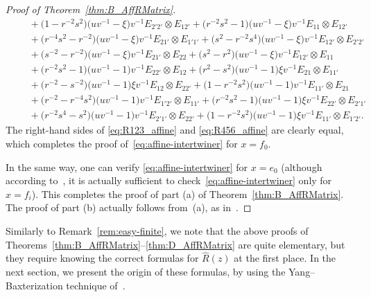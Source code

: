 \documentclass[10pt,a4paper]{amsart}
\numberwithin{equation}{section}
\begin{document}
\begin{proof}[Proof of Theorem~\ref{thm:B_AffRMatrix}]
\begin{gather}
 \qquad{} + \bigl(1 - r^{-2}s^{2}\bigr)\bigl(uv^{-1} - \xi\bigr)v^{-1}E_{2'2'} \otimes E_{12'} + \bigl(r^{-2}s^{2} - 1\bigr)\bigl(uv^{-1} - \xi\bigr)v^{-1}E_{11} \otimes E_{12'} \nonumber\\
 \qquad{} + \bigl(r^{-4}s^{2} - r^{-2}\bigr)\bigl(uv^{-1} -\xi\bigr)v^{-1}E_{21'} \otimes E_{1'1'} + \bigl(s^{2} - r^{-2}s^{4}\bigr)\bigl(uv^{-1} - \xi\bigr)v^{-1}E_{12'} \otimes E_{2'2'} \nonumber\\
 \qquad{} + \bigl(s^{-2} - r^{-2}\bigr)\bigl(uv^{-1} - \xi\bigr)v^{-1}E_{21'} \otimes E_{22} + \bigl(s^{2} - r^{2}\bigr)\bigl(uv^{-1} - \xi\bigr)v^{-1}E_{12'} \otimes E_{11} \nonumber\\
 \qquad{} +\bigl(r^{-2}s^{2} - 1\bigr)\bigl(uv^{-1} - 1\bigr)v^{-1}E_{22'} \otimes E_{12} +\bigl(r^{2} - s^{2}\bigr)\bigl(uv^{-1} - 1\bigr)\xi v^{-1}E_{21} \otimes E_{11'} \nonumber\\
 \qquad{} + \bigl(r^{-2} - s^{-2}\bigr)\bigl(uv^{-1} - 1\bigr)\xi v^{-1}E_{12} \otimes E_{22'} + \bigl(1 - r^{-2}s^{2}\bigr)\bigl(uv^{-1} - 1\bigr)v^{-1}E_{11'} \otimes E_{21} \nonumber\\
 \qquad{} +\bigl(r^{-2} - r^{-4}s^{2}\bigr)\bigl(uv^{-1} - 1\bigr)v^{-1}E_{1'2'} \otimes E_{11'} + \bigl(r^{-2}s^{2} - 1\bigr)\bigl(uv^{-1} - 1\bigr)\xi v^{-1}E_{22'} \otimes E_{2'1'} \nonumber\\
 \qquad{} + \bigl(r^{-2}s^{4} - s^{2}\bigr)\bigl(uv^{-1} - 1\bigr)v^{-1}E_{2'1'} \otimes E_{22'} + \bigl(1 - r^{-2}s^{2}\bigr)\bigl(uv^{-1} - 1\bigr)\xi v^{-1}E_{11'} \otimes E_{1'2'}.\nonumber
\end{gather}
The right-hand sides of \eqref{eq:R123_affine} and \eqref{eq:R456_affine} are clearly equal, which completes the proof of~\eqref{eq:affine-intertwiner} for $x = f_{0}$.

In the same way, one can verify \eqref{eq:affine-intertwiner} for $x = e_{0}$ (although according to~\cite{Jim}, it is actually sufficient to check~\eqref{eq:affine-intertwiner} only for $x = f_{i}$). This completes the proof of part (a) of Theorem~\ref{thm:B_AffRMatrix}. The proof of part (b) actually follows from~(a), as in~\cite[Proposition~3]{Jim}.
\end{proof}

\begin{Remark}%
Similarly to Remark~\ref{rem:easy-finite}, we note that the above proofs of Theorems~\ref{thm:B_AffRMatrix}--\ref{thm:D_AffRMatrix} are quite elementary, but they require knowing the correct formulas for $\hat{R}(z)$ at the first place. In the next section, we present the origin of these formulas, by using the Yang--Baxterization technique of~\cite{GWX}.
\end{Remark}
\end{document}
